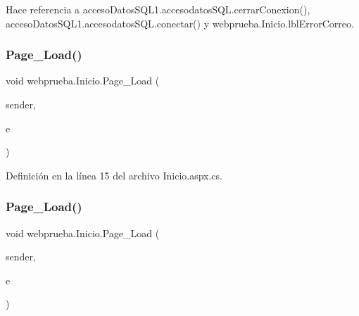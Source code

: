 Hace referencia a acceso\+Datos\+S\+Q\+L1.\+accesodatos\+S\+Q\+L.\+cerrar\+Conexion(), acceso\+Datos\+S\+Q\+L1.\+accesodatos\+S\+Q\+L.\+conectar() y webprueba.\+Inicio.\+lbl\+Error\+Correo.

\mbox{\label{classwebprueba_1_1_inicio_aba96a902e36c94a92c715ac3f5ba09a1}} 
\subsubsection{\texorpdfstring{Page\_Load()}{Page\_Load()}\hspace{0.1cm}{\footnotesize\ttfamily [1/2]}}
{\footnotesize\ttfamily void webprueba.\+Inicio.\+Page\+\_\+\+Load (\begin{DoxyParamCaption}\item[{object}]{sender,  }\item[{Event\+Args}]{e }\end{DoxyParamCaption})\hspace{0.3cm}{\ttfamily [protected]}}



Definición en la línea 15 del archivo Inicio.\+aspx.\+cs.


\begin{DoxyCode}{0}

\end{DoxyCode}
\mbox{\label{classwebprueba_1_1_inicio_aba96a902e36c94a92c715ac3f5ba09a1}} 
\subsubsection{\texorpdfstring{Page\_Load()}{Page\_Load()}\hspace{0.1cm}{\footnotesize\ttfamily [2/2]}}
{\footnotesize\ttfamily void webprueba.\+Inicio.\+Page\+\_\+\+Load (\begin{DoxyParamCaption}\item[{object}]{sender,  }\item[{Event\+Args}]{e }\end{DoxyParamCaption})\hspace{0.3cm}{\ttfamily [protected]}}



